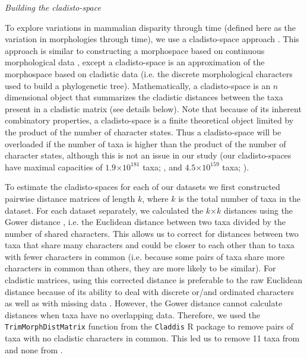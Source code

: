 \documentclass[12pt,letterpaper]{article}
\renewcommand{\subsection}[1]{%
\bigskip
\begin{center}
\begin{large}
\normalfont\itshape #1
\end{large}
\end{center}}
\begin{document}
\subsection{Building the cladisto-space}
To explore variations in mammalian disparity through time (defined here as the variation in morphologies through time), we use a cladisto-space approach \citep[e.g.][]{Foote01071994,Foote29111996,Wesley-Hunt2005,Brusatte12092008,friedmanexplosive2010,toljagictriassic-jurassic2013,Hughes20082013}.
This approach is similar to constructing a morphospace based on continuous morphological data \citep[e.g.][]{friedmanexplosive2010}, except a cladisto-space is an approximation of the morphospace based on cladistic data (i.e. the discrete morphological characters used to build a phylogenetic tree).
Mathematically, a cladisto-space is an $n$ dimensional object that summarizes the cladistic distances between the taxa present in a cladistic matrix (see details below).
Note that because of its inherent combinatory properties, a cladisto-space is a finite theoretical object limited by the product of the number of character states. Thus a cladisto-space will be overloaded if the number of taxa is higher than the product of the number of character states, although this is not an issue in our study (our cladisto-spaces have maximal capacities of $1.9$$\times$$10^{181}$ taxa; \citealp{Slater2012MEE}, and $4.5$$\times$$10^{159}$ taxa; \citealp{beckancient2014}).  

To estimate the cladisto-spaces for each of our datasets we first constructed pairwise distance matrices of length $k$, where $k$ is the total number of taxa in the dataset. 
For each dataset separately, we calculated the $k$$\times$$k$ distances using the Gower distance \citep{Gower71}, i.e. the Euclidean distance between two taxa divided by the number of shared characters. 
This allows us to correct for distances between two taxa that share many characters and could be closer to each other than to taxa with fewer characters in common (i.e. because some pairs of taxa share more characters in common than others, they are more likely to be similar).
For cladistic matrices, using this corrected distance is preferable to the raw Euclidean distance because of its ability to deal with discrete or/and ordinated characters as well as with missing data \citep{anderson2012using}.
However, the Gower distance cannot calculate distances when taxa have no overlapping data.
Therefore, we used the \texttt{TrimMorphDistMatrix} function from the \texttt{Claddis} R package \citep{Claddis} to remove pairs of taxa with no cladistic characters in common.
This led us to remove 11 taxa from \cite{Slater2012MEE} and none from \cite{beckancient2014}.
\end{document}
